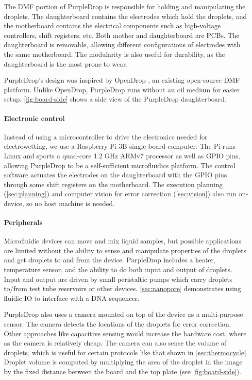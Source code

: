 \documentclass[sigconf, screen]{acmart}
\begin{document}
The DMF portion of PurpleDrop is responsible for holding and manipulating the droplets.
The daughterboard contains the electrodes which hold the droplets, and the motherboard contains the electrical components such as high-voltage controllers, shift registers, etc.
Both mother and daughterboard are PCBs.
The daughterboard is removable, allowing different configurations of electrodes with the same motherboard.
The modularity is also useful for durability, as the daughterboard is the most prone to wear.

PurpleDrop's design was inspired by OpenDrop \cite{opendrop}, an existing open-source DMF platform.
Unlike OpenDrop, PurpleDrop runs without an oil medium for easier setup.
\autoref{fig:board-side} shows a side view of the PurpleDrop daughterboard.

\paragraph{Electronic control}

Instead of using a microcontroller to drive the electronics needed for electrowetting, we use a Raspberry Pi 3B \cite{raspberry-pi-3b} single-board computer.
The Pi runs Linux and sports a quad-core 1.2 GHz ARMv7 processor as well as GPIO pins, allowing PurpleDrop to be a self-sufficient microfluidics platform.
The control software actuates the electrodes on the daughterboard with the GPIO pins through some shift registers on the motherboard.
The execution planning (\autoref{sec:planning}) and computer vision for error correction (\autoref{sec:vision}) also run on-device, so no host machine is needed.

\paragraph{Peripherals}

Microfluidic devices can move and mix liquid samples, but possible applications are limited without the ability to sense and manipulate properties of the droplets and get droplets to and from the device.
PurpleDrop includes a heater, temperature sensor, and the ability to do both input and output of droplets.
Input and output are driven by small peristaltic pumps which carry droplets to/from test tube reservoirs or other devices.
\autoref{sec:nanopore} demonstrates using fluidic IO to interface with a DNA sequencer.

PurpleDrop also uses a camera mounted on top of the device as a multi-purpose sensor.
The camera detects the locations of the droplets for error correction.
Other approaches like capacitive sensing \cite{bhattacharjee2012capacitance} would increase the hardware cost, where as the camera is relatively cheap.
The camera can also sense the volume of droplets, which is useful for certain protocols like that shown in \autoref{sec:thermocycle}.
Droplet volume is computed by multiplying the area of the droplet in the image by the fixed distance between the board and the top plate (see \autoref{fig:board-side}).
\end{document}
